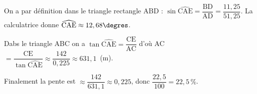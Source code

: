 \begin{enumerate}
%	
%	
%	
On a par définition dans le triangle rectangle ABD : $\sin \widehat{\text{CAE}} = \dfrac{\text{BD}}{\text{AD}} = \dfrac{11,25}{51,25}$. La calculatrice donne $\widehat{\text{CAE}} \approx 12,68\degres$.

Dabs le triangle ABC on a $\tan \widehat{\text{CAE}} = \dfrac{\text{CE}}{\text{AC}}$ d'où AC $ = \dfrac{\text{CE}}{\tan \widehat{\text{CAE}}} \approx \dfrac{142}{0,225} \approx 631,1$~(m).

Finalement la pente  est  $\approx \dfrac{142}{631,1} \approx 0,225$, donc $\dfrac{22,5}{100} = 22,5\,\%$. 
\end{enumerate}

\vspace{0,5cm}

